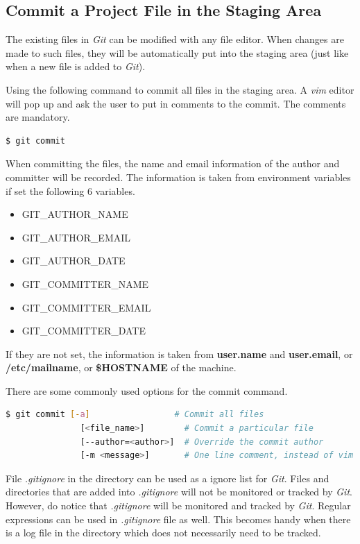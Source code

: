\documentclass[a4paper]{article}
\begin{document}
\subsection{Commit a Project File in the Staging Area}

The existing files in \textit{Git} can be modified with any file editor. When changes are made to such files, they will be automatically put into the staging area (just like when a new file is added to \textit{Git}).

Using the following command to commit all files in the staging area. A \textit{vim} editor will pop up and ask the user to put in comments to the commit. The comments are mandatory.
\begin{lstlisting}[backgroundcolor = \color{lightgray},language=bash]
  $ git commit
\end{lstlisting}

When committing the files, the name and email information of the author and committer will be recorded. The information is taken from environment variables if set the following 6 variables.
\begin{itemize}
  \item GIT\_AUTHOR\_NAME
  \item GIT\_AUTHOR\_EMAIL
  \item GIT\_AUTHOR\_DATE
  \item GIT\_COMMITTER\_NAME
  \item GIT\_COMMITTER\_EMAIL
  \item GIT\_COMMITTER\_DATE
\end{itemize}
If they are not set, the information is taken from \textbf{user.name} and \textbf{user.email}, or \textbf{/etc/mailname}, or \textbf{\$HOSTNAME} of the machine.

There are some commonly used options for the commit command.
\begin{lstlisting}[backgroundcolor = \color{lightgray},language=bash]
  $ git commit [-a]                 # Commit all files
               [<file_name>]        # Commit a particular file
               [--author=<author>]  # Override the commit author
               [-m <message>]       # One line comment, instead of vim comment
\end{lstlisting}

File \textit{.gitignore} in the directory can be used as a ignore list for \textit{Git}. Files and directories that are added into \textit{.gitignore} will not be monitored or tracked by \textit{Git}. However, do notice that \textit{.gitignore} will be monitored and tracked by \textit{Git}. Regular expressions can be used in \textit{.gitignore} file as well. This becomes handy when there is a log file in the directory which does not necessarily need to be tracked.
\end{document}
